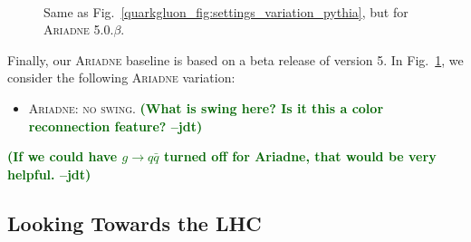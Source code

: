 \documentclass[11pt]{cernrep}
\newcommand{\jdt}[1]{\textbf{\textcolor{darkgreen}{(#1 --jdt)}}}
\begin{document}
\begin{figure}
\centering
{}
$\qquad$
\caption{Same as Fig.~\ref{quarkgluon_fig:settings_variation_pythia}, but for \textsc{Ariadne 5.0.$\beta$}.}
\label{quarkgluon_fig:settings_variation_ariadne}
\end{figure}

Finally, our \textsc{Ariadne} baseline is based on a beta release of version 5.  In Fig.~\ref{quarkgluon_fig:settings_variation_ariadne}, we consider the following \textsc{Ariadne} variation:
\begin{itemize}
\item \textsc{Ariadne: no swing}.  \jdt{What is swing here?  Is it this a color reconnection feature?}
\end{itemize}
\jdt{If we could have $g \to q \bar{q}$ turned off for Ariadne, that would be very helpful.}


\subsection{Looking Towards the LHC}
\label{quarkgluon_sec:pp}
\end{document}
